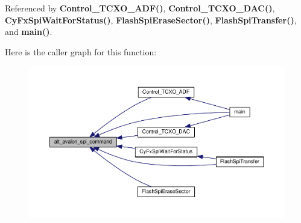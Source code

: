 Referenced by {\bf Control\+\_\+\+T\+C\+X\+O\+\_\+\+A\+D\+F()}, {\bf Control\+\_\+\+T\+C\+X\+O\+\_\+\+D\+A\+C()}, {\bf Cy\+Fx\+Spi\+Wait\+For\+Status()}, {\bf Flash\+Spi\+Erase\+Sector()}, {\bf Flash\+Spi\+Transfer()}, and {\bf main()}.



Here is the caller graph for this function\+:
\nopagebreak
\begin{figure}[H]
\begin{center}
\leavevmode
\includegraphics[width=350pt]{d5/d51/altera__avalon__spi_8c_aa51d00139d8c14135648e727d150936d_icgraph}
\end{center}
\end{figure}


